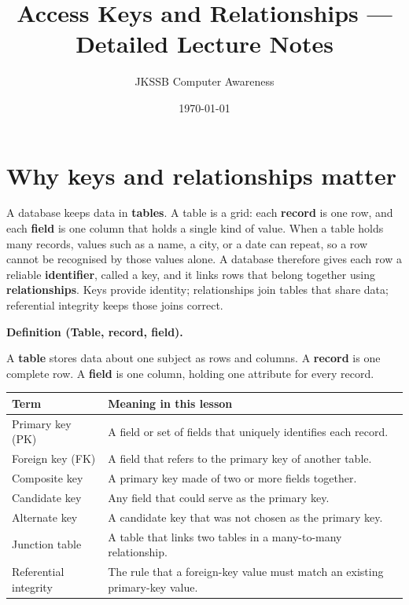 \documentclass[11pt]{article}
\title{Access Keys and Relationships --- Detailed Lecture Notes}
\author{JKSSB Computer Awareness}
\date{\today}
\newenvironment{definitionbox}[1]{%
  \par\noindent\textbf{Definition (#1).}\ \itshape
}{\par\vspace{0.3em}}
\begin{document}
\maketitle

\section{Why keys and relationships matter}
A database keeps data in \textbf{tables}. A table is a grid: each
\textbf{record} is one row, and each \textbf{field} is one column that holds a
single kind of value. When a table holds many records, values such as a name,
a city, or a date can repeat, so a row cannot be recognised by those values
alone. A database therefore gives each row a reliable \textbf{identifier},
called a key, and it links rows that belong together using
\textbf{relationships}. Keys provide identity; relationships join tables that
share data; referential integrity keeps those joins correct.

\begin{definitionbox}{Table, record, field}
A \textbf{table} stores data about one subject as rows and columns. A
\textbf{record} is one complete row. A \textbf{field} is one column, holding
one attribute for every record.
\end{definitionbox}

\begin{center}
\begin{tabular}{p{}p{}}
\toprule
\textbf{Term} & \textbf{Meaning in this lesson} \\
\midrule
Primary key (PK) & A field or set of fields that uniquely identifies each record. \\
Foreign key (FK) & A field that refers to the primary key of another table. \\
Composite key & A primary key made of two or more fields together. \\
Candidate key & Any field that could serve as the primary key. \\
Alternate key & A candidate key that was not chosen as the primary key. \\
Junction table & A table that links two tables in a many-to-many relationship. \\
Referential integrity & The rule that a foreign-key value must match an existing primary-key value. \\
\bottomrule
\end{tabular}
\end{center}
\end{document}
